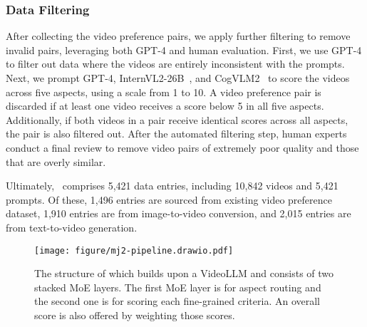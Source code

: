 




   










\subsubsection{Data Filtering}

After collecting the video preference pairs, we apply further filtering to remove invalid pairs, leveraging both GPT-4 and human evaluation. First, we use GPT-4 to filter out data where the videos are entirely inconsistent with the prompts. Next, we prompt GPT-4, InternVL2-26B~\citep{chen2023internvl}, and CogVLM2~\citep{hong2024cogvlm2} to score the videos across five aspects, using a scale from 1 to 10. A video preference pair is discarded if at least one video receives a score below 5 in all five aspects. Additionally, if both videos in a pair receive identical scores across all aspects, the pair is also filtered out. After the automated filtering step, human experts conduct a final review to remove video pairs of extremely poor quality and those that are overly similar.

Ultimately, \datasetname\ comprises 5,421 data entries, including 10,842 videos and 5,421 prompts. Of these, 1,496 entries are sourced from existing video preference dataset, 1,910 entries are from image-to-video conversion, and 2,015 entries are from text-to-video generation.



\begin{figure*}[t]
    \centering
    \texttt{[image: figure/mj2-pipeline.drawio.pdf]}
    \caption{The structure of \algname which builds upon a VideoLLM and consists of two stacked MoE layers. The first MoE layer is for aspect routing and the second one is for scoring each fine-grained criteria. An overall score is also offered by weighting those scores. }
    \label{fig:MoE}
    \vspace{-1em}
\end{figure*}



